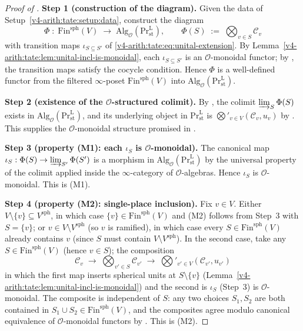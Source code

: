 \begin{proof}[Proof of ]

\medskip\noindent\textbf{Step 1 (construction of the diagram).}
Given the data of Setup~\ref{v4-arith:tate:setup:data}, construct
the diagram
\[
\Phi\;:\;\mathrm{Fin}^{\mathrm{sph}}(V)\;\longrightarrow\;\mathrm{Alg}_{\mathcal{O}}(\mathrm{Pr}^{\mathrm{L}}_{\mathrm{st}}),
\qquad\Phi(S)\;:=\;\bigotimes_{v\in S}\mathcal{C}_{v}
\]
with transition maps \(\iota_{S\subseteq S'}\) of
\eqref{v4-arith:tate:eq:unital-extension}. By
Lemma~\ref{v4-arith:tate:lem:unital-incl-is-monoidal}, each
\(\iota_{S\subseteq S'}\) is an \(\mathcal{O}\)-monoidal functor; by
, the transition maps
satisfy the cocycle condition. Hence \(\Phi\) is a well-defined
functor from the filtered \(\infty\)-poset
\(\mathrm{Fin}^{\mathrm{sph}}(V)\) into
\(\mathrm{Alg}_{\mathcal{O}}(\mathrm{Pr}^{\mathrm{L}}_{\mathrm{st}})\).

\medskip\noindent\textbf{Step 2 (existence of the \(\mathcal{O}\)-structured colimit).}
By
, the colimit
\(\varinjlim_{S}\Phi(S)\) exists in
\(\mathrm{Alg}_{\mathcal{O}}(\mathrm{Pr}^{\mathrm{L}}_{\mathrm{st}})\),
and its underlying object in
\(\mathrm{Pr}^{\mathrm{L}}_{\mathrm{st}}\) is
\(\bigotimes'_{v\in V}(\mathcal{C}_{v},u_{v})\) by
. This supplies the
\(\mathcal{O}\)-monoidal structure promised in
.

\medskip\noindent\textbf{Step 3 (property (M1): each \(\iota_{S}\) is \(\mathcal{O}\)-monoidal).}
The canonical map
\(\iota_{S}:\Phi(S)\to\varinjlim_{S'}\Phi(S')\) is a morphism in
\(\mathrm{Alg}_{\mathcal{O}}(\mathrm{Pr}^{\mathrm{L}}_{\mathrm{st}})\)
by the universal property of the colimit applied inside the
\(\infty\)-category of \(\mathcal{O}\)-algebras. Hence \(\iota_{S}\) is
\(\mathcal{O}\)-monoidal. This is (M1).

\medskip\noindent\textbf{Step 4 (property (M2): single-place inclusion).}
Fix \(v\in V\). Either \(V\setminus\{v\}\subseteq V^{\mathrm{sph}}\),
in which case \(\{v\}\in\mathrm{Fin}^{\mathrm{sph}}(V)\) and (M2)
follows from Step~3 with \(S=\{v\}\); or \(v\in V\setminus V^{\mathrm{sph}}\)
(so \(v\) is ramified), in which case every \(S\in\mathrm{Fin}^{\mathrm{sph}}(V)\)
already contains \(v\) (since \(S\) must contain \(V\setminus V^{\mathrm{sph}}\)).
In the second case, take any \(S\in\mathrm{Fin}^{\mathrm{sph}}(V)\)
(hence \(v\in S\)); the composition
\[
\mathcal{C}_{v}\;\longrightarrow\;\bigotimes_{v'\in S}\mathcal{C}_{v'}\;\longrightarrow\;\bigotimes'_{v'\in V}(\mathcal{C}_{v'},u_{v'})
\]
in which the first map inserts spherical units at \(S\setminus\{v\}\)
(Lemma~\ref{v4-arith:tate:lem:unital-incl-is-monoidal}) and the
second is \(\iota_{S}\) (Step~3) is \(\mathcal{O}\)-monoidal. The
composite is independent of \(S\): any two choices \(S_{1},S_{2}\)
are both contained in \(S_{1}\cup S_{2}\in\mathrm{Fin}^{\mathrm{sph}}(V)\),
and the composites agree modulo canonical equivalence of
\(\mathcal{O}\)-monoidal functors by .
This is (M2).


\end{proof}
